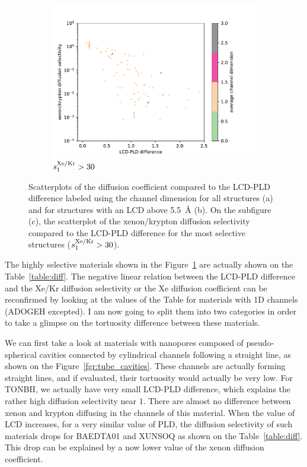 \documentclass[main]{subfiles}
\begin{document}
\begin{figure}[ht]
\begin{subfigure}[b]{0.32\textwidth}
      \centering
      \includegraphics[width=\textwidth]{figures/5-diffusion/diff_D_xekr-poresize-chandim.pdf}
      \caption{$s^{\text{Xe/Kr}}_1>30$}\label{fgr:porediff_c}
  \end{subfigure}
     \caption{ Scatterplots of the diffusion coefficient compared to the LCD-PLD difference labeled using the channel dimension for all structures (a) and for structures with an LCD above \SI{5.5}{\angstrom} (b). On the subfigure (c), the scatterplot of the xenon/krypton diffusion selectivity compared to the LCD-PLD difference for the most selective structures ($s^{\text{Xe/Kr}}_1>30$). }\label{fgr:porediff}
\end{figure}

The highly selective materials shown in the Figure~\ref{fgr:porediff_c} are actually shown on the Table~\ref{table:diff}. The negative linear relation between the LCD-PLD difference and the Xe/Kr diffusion selectivity or the Xe diffusion coefficient can be reconfirmed by looking at the values of the Table for materials with 1D channels (ADOGEH excepted). I am now going to split them into two categories in order to take a glimpse on the tortuosity difference between these materials.  

We can first take a look at materials with nanopores composed of pseudo-spherical cavities connected by cylindrical channels following a straight line, as shown on the Figure~\ref{fgr:tube_cavities}. These channels are actually forming straight lines, and if evaluated, their tortuosity would actually be very low. For TONBII, we actually have very small LCD-PLD difference, which explains the rather high diffusion selectivity near $1$. There are almost no difference between xenon and krypton diffusing in the channels of this material. When the value of LCD increases, for a very similar value of PLD, the diffusion selectivity of such materials drops for BAEDTA01 and XUNSOQ as shown on the Table~\ref{table:diff}. This drop can be explained by a now lower value of the xenon diffusion coefficient. 
\end{document}
